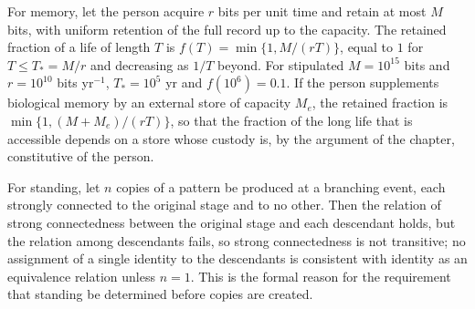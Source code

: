 For memory, let the person acquire $r$ bits per unit time and retain at most $M$ bits, with uniform retention of the full record up to the capacity. The retained fraction of a life of length $T$ is $f(T)=\min\{1,M/(rT)\}$, equal to $1$ for $T\le T_\ast=M/r$ and decreasing as $1/T$ beyond. For stipulated $M=10^{15}$ bits and $r=10^{10}$ bits yr$^{-1}$, $T_\ast=10^5$ yr and $f(10^6)=0.1$. If the person supplements biological memory by an external store of capacity $M_e$, the retained fraction is $\min\{1,(M+M_e)/(rT)\}$, so that the fraction of the long life that is accessible depends on a store whose custody is, by the argument of the chapter, constitutive of the person.

For standing, let $n$ copies of a pattern be produced at a branching event, each strongly connected to the original stage and to no other. Then the relation of strong connectedness between the original stage and each descendant holds, but the relation among descendants fails, so strong connectedness is not transitive; no assignment of a single identity to the descendants is consistent with identity as an equivalence relation unless $n=1$. This is the formal reason for the requirement that standing be determined before copies are created.
